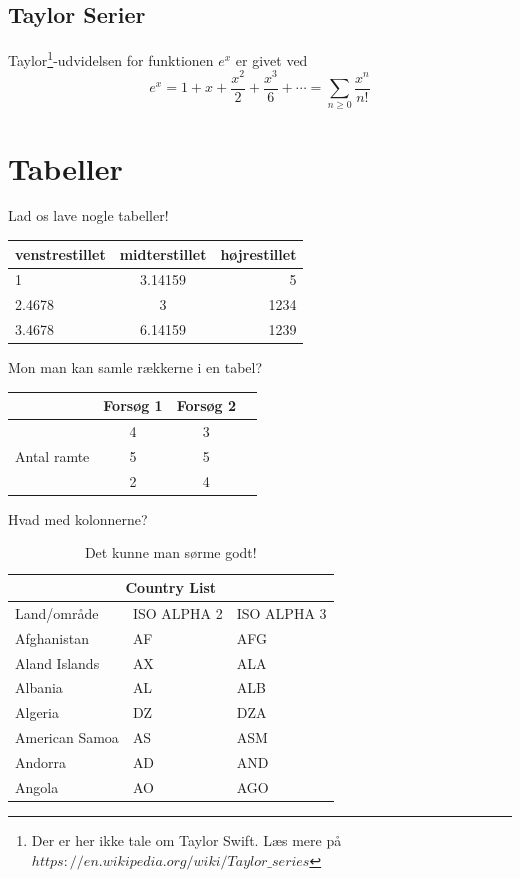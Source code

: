 \documentclass[]{article}
\begin{document}
\subsection{Taylor Serier}
Taylor\footnote{Der er her ikke tale om Taylor Swift. Læs mere på $https://en.wikipedia.org/wiki/Taylor\_series$}-udvidelsen for funktionen $e^x$ er givet ved
\[
	e^x = 1 + x + \frac{x^2}{2} + \frac{x^3}{6} + \cdots = \sum_{n\geq 0} \frac{x^n}{n!}
\]

\section{Tabeller}
Lad os lave nogle tabeller!

\begin{center}
	\noindent
	\begin{tabular}{l||c|r}
		venstrestillet & midterstillet & højrestillet \\ \hline
		1 & 3.14159 & 5 \\
		2.4678 & 3 &  1234 \\ \hline \hline
		3.4678 & 6.14159 & 1239
	\end{tabular}
\end{center}


Mon man kan samle rækkerne i en tabel?

\begin{center}
	\noindent
	\begin{tabular}{|c|c|c|c| } 
		\hline
		 & Forsøg 1 & Forsøg 2 \\
		\hline
		\multirow{3}{4em}{Antal ramte} & 4 & 3 \\ 
									   & 5 & 5 \\ 
									   & 2 & 4 \\ 
		\hline
	\end{tabular}
\end{center}
\newpage

Hvad med kolonnerne?
\begin{table}[h]
	\begin{center}
		\begin{tabular}{ |p{3cm}|p{3cm}|p{3cm}|  }
		\hline
		\multicolumn{3}{|c|}{Country List} \\
		\hline
		Land/område& ISO ALPHA 2 &ISO ALPHA 3 \\
		\hline
		Afghanistan & AF & AFG \\
		Aland Islands & AX   & ALA \\
		Albania &AL & ALB \\
		Algeria    &DZ & DZA \\
		American Samoa & AS & ASM \\
		Andorra & AD & AND   \\
		Angola & AO & AGO \\
		\hline
		\end{tabular}

		\caption{Det kunne man sørme godt!}
	\end{center}
\end{table}
\end{document}
